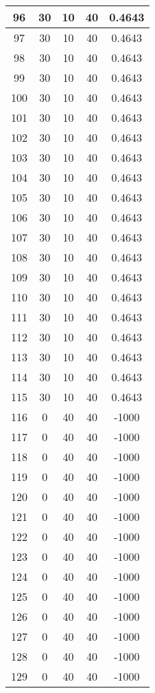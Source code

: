 \documentclass[letterpaper, 12pt]{article}
\begin{document}
\begin{longtable}{|c|c|c|c|c|}
96 & 30 & 10 & 40 & 0.4643 \\
\hline
97 & 30 & 10 & 40 & 0.4643 \\
\hline
98 & 30 & 10 & 40 & 0.4643 \\
\hline
99 & 30 & 10 & 40 & 0.4643 \\
\hline
100 & 30 & 10 & 40 & 0.4643 \\
\hline
101 & 30 & 10 & 40 & 0.4643 \\
\hline
102 & 30 & 10 & 40 & 0.4643 \\
\hline
103 & 30 & 10 & 40 & 0.4643 \\
\hline
104 & 30 & 10 & 40 & 0.4643 \\
\hline
105 & 30 & 10 & 40 & 0.4643 \\
\hline
106 & 30 & 10 & 40 & 0.4643 \\
\hline
107 & 30 & 10 & 40 & 0.4643 \\
\hline
108 & 30 & 10 & 40 & 0.4643 \\
\hline
109 & 30 & 10 & 40 & 0.4643 \\
\hline
110 & 30 & 10 & 40 & 0.4643 \\
\hline
111 & 30 & 10 & 40 & 0.4643 \\
\hline
112 & 30 & 10 & 40 & 0.4643 \\
\hline
113 & 30 & 10 & 40 & 0.4643 \\
\hline
114 & 30 & 10 & 40 & 0.4643 \\
\hline
115 & 30 & 10 & 40 & 0.4643 \\
\hline
116 & 0 & 40 & 40 & -1000 \\
\hline
117 & 0 & 40 & 40 & -1000 \\
\hline
118 & 0 & 40 & 40 & -1000 \\
\hline
119 & 0 & 40 & 40 & -1000 \\
\hline
120 & 0 & 40 & 40 & -1000 \\
\hline
121 & 0 & 40 & 40 & -1000 \\
\hline
122 & 0 & 40 & 40 & -1000 \\
\hline
123 & 0 & 40 & 40 & -1000 \\
\hline
124 & 0 & 40 & 40 & -1000 \\
\hline
125 & 0 & 40 & 40 & -1000 \\
\hline
126 & 0 & 40 & 40 & -1000 \\
\hline
127 & 0 & 40 & 40 & -1000 \\
\hline
128 & 0 & 40 & 40 & -1000 \\
\hline
129 & 0 & 40 & 40 & -1000 \\

\end{longtable}
\end{document}
